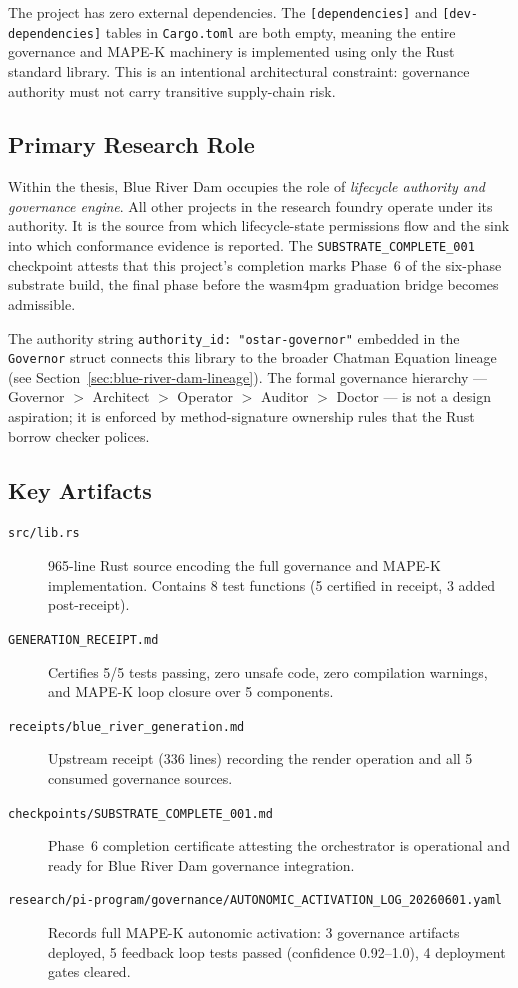 The project has zero external dependencies. The \texttt{[dependencies]} and
\texttt{[dev-dependencies]} tables in \texttt{Cargo.toml} are both empty,
meaning the entire governance and MAPE-K machinery is implemented using only
the Rust standard library. This is an intentional architectural constraint:
governance authority must not carry transitive supply-chain risk.

\subsection{Primary Research Role}
\label{sec:blue-river-dam-identity-role}

Within the thesis, Blue River Dam occupies the role of
\emph{lifecycle authority and governance engine}. All other projects in the
research foundry operate under its authority. It is the source from which
lifecycle-state permissions flow and the sink into which conformance evidence
is reported. The \texttt{SUBSTRATE\_COMPLETE\_001} checkpoint attests that this
project's completion marks Phase~6 of the six-phase substrate build, the
final phase before the wasm4pm graduation bridge becomes admissible.

The authority string \texttt{authority\_id: "ostar-governor"} embedded in the
\texttt{Governor} struct connects this library to the broader Chatman Equation
lineage (see Section~\ref{sec:blue-river-dam-lineage}). The formal governance
hierarchy — Governor $>$ Architect $>$ Operator $>$ Auditor $>$ Doctor --- is
not a design aspiration; it is enforced by method-signature ownership rules
that the Rust borrow checker polices.

\subsection{Key Artifacts}
\label{sec:blue-river-dam-identity-artifacts}

\begin{description}
  \item[\texttt{src/lib.rs}] 965-line Rust source encoding the full governance
    and MAPE-K implementation.  Contains 8 test functions (5 certified in
    receipt, 3 added post-receipt).
  \item[\texttt{GENERATION\_RECEIPT.md}] Certifies 5/5 tests passing, zero
    unsafe code, zero compilation warnings, and MAPE-K loop closure over 5
    components.
  \item[\texttt{receipts/blue\_river\_generation.md}] Upstream receipt (336
    lines) recording the render operation and all 5 consumed governance
    sources.
  \item[\texttt{checkpoints/SUBSTRATE\_COMPLETE\_001.md}] Phase~6 completion
    certificate attesting the orchestrator is operational and ready for Blue
    River Dam governance integration.
  \item[\texttt{research/pi-program/governance/AUTONOMIC\_ACTIVATION\_LOG\_20260601.yaml}]
    Records full MAPE-K autonomic activation: 3 governance artifacts deployed,
    5 feedback loop tests passed (confidence 0.92--1.0), 4 deployment gates
    cleared.
\end{description}
